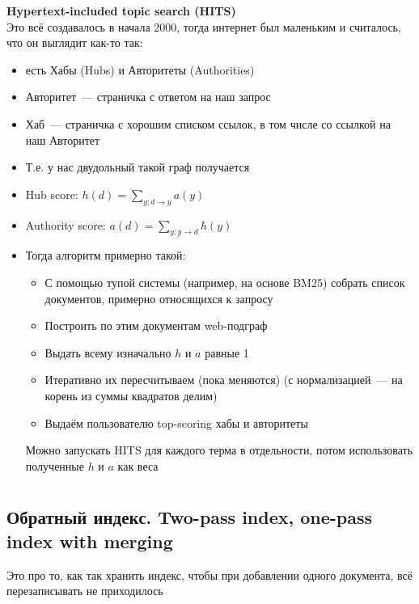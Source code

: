 \documentclass[12pt]{article}
\begin{document}
    \smallskip\smallskip
    {\bf Hypertext-included topic search (HITS)}\\
    Это всё создавалось в начала 2000, тогда интернет был маленьким и считалось, что он выглядит как-то так:
    \begin{itemize}
      \item есть Хабы (Hubs) и Авторитеты (Authorities)
      \item Авторитет~--- страничка с ответом на наш запрос
      \item Хаб~--- страничка с хорошим списком ссылок, в том числе со ссылкой на наш Авторитет
      \item Т.е. у нас двудольный такой граф получается
      \item Hub score: $h(d) = \sum\limits_{y: d \to y} a(y)$
      \item Authority score: $a(d) = \sum\limits_{y: y \to d} h(y)$
      \pagebreak
      \item Тогда алгоритм примерно такой:
        \begin{itemize}
          \item С помощью тупой системы (например, на основе BM25) собрать список документов, примерно относящихся к запросу
          \item Построить по этим документам web-подграф
          \item Выдать всему изначально $h$ и $a$ равные 1
          \item Итеративно их пересчитываем (пока меняются) (с нормализацией~--- на корень из суммы квадратов делим)
          \item Выдаём пользователю top-scoring хабы и авторитеты
        \end{itemize} 
        Можно запускать HITS для каждого терма в отдельности, потом использовать полученные $h$ и $a$ как веса
    \end{itemize}
\pagebreak %

\section{} %

  \subsection{Обратный индекс. Two-pass index, one-pass index with merging}
    Это про то, как так хранить индекс, чтобы при добавлении одного документа, всё перезаписывать не приходилось
\end{document}
